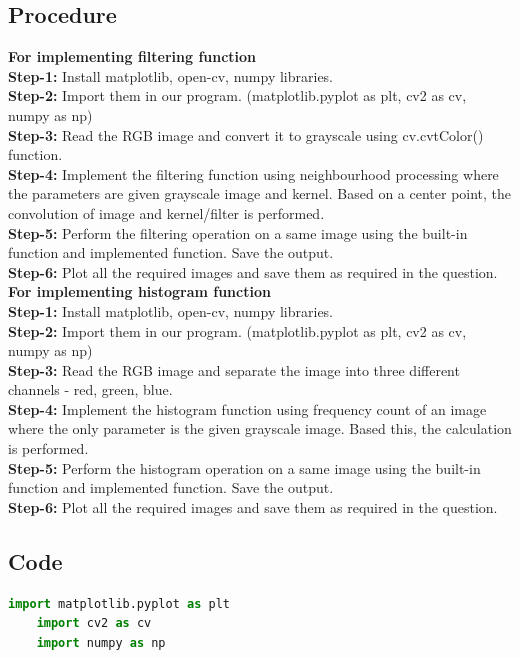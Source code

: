 \documentclass{article}
\begin{document}
{    \subsection{Procedure}
    \textbf{For implementing filtering function}\\
    \textbf{Step-1:}
    Install matplotlib, open-cv, numpy libraries.\\
    \textbf{Step-2:}
    Import them in our program. (matplotlib.pyplot as plt, cv2 as cv, numpy as np)\\
    \textbf{Step-3:}
    Read the RGB image and convert it to grayscale using cv.cvtColor() function.\\
    \textbf{Step-4:}
    Implement the filtering function using neighbourhood processing where the parameters are given grayscale image and kernel. Based on a center point, the convolution of image and kernel/filter is performed.\\
    \textbf{Step-5:}
    Perform the filtering operation on a same image using the built-in function and implemented function. Save the output.\\
    \textbf{Step-6:}
    Plot all the required images and save them as required in the question.\\
    
    \textbf{For implementing histogram function}\\
    \textbf{Step-1:}
    Install matplotlib, open-cv, numpy libraries.\\
    \textbf{Step-2:}
    Import them in our program. (matplotlib.pyplot as plt, cv2 as cv, numpy as np)\\
    \textbf{Step-3:}
    Read the RGB image and separate the image into three different channels - red, green, blue.\\
    \textbf{Step-4:}
    Implement the histogram function using frequency count of an image where the only parameter is the given grayscale image. Based this, the calculation is performed.\\
    \textbf{Step-5:}
    Perform the histogram operation on a same image using the built-in function and implemented function. Save the output.\\
    \textbf{Step-6:}
    Plot all the required images and save them as required in the question.\\
    
    \subsection{Code}
    \lstset{style=mystyle}
    \begin{lstlisting}[language=Python, caption=Code for implementing filtering function and compare it with built-in function]
    import matplotlib.pyplot as plt
    import cv2 as cv
    import numpy as np
    

\end{lstlisting}}
\end{document}
